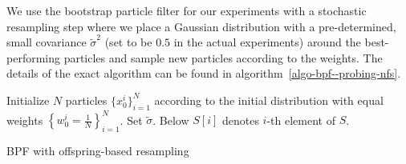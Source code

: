 We use the bootstrap particle filter for our experiments with a stochastic resampling step where we place a Gaussian distribution with a pre-determined, small covariance {\color{mypink}$\tilde\sigma^2$ (set to be $0.5$ in the actual experiments)} around the best-performing particles and sample new particles according to the weights. 
{\color{mypink} The details of the exact algorithm can be found in algorithm~\ref{algo-bpf--probing-nfs}.}
\begin{algorithm}[!t]
\textcolor{mypink}{Initialize $N$ particles $\{x_0^i\}_{i=1}^N$ according to the initial distribution with equal weights $\left\{w_0^i=\frac{1}{N}\right\}_{i=1}^N$. Set $\tilde\sigma$. Below $S[i]$ denotes $i$-th element of $S$.\\
 \caption{BPF with offspring-based resampling}\label{algo-bpf--probing-nfs}}
\end{algorithm}

